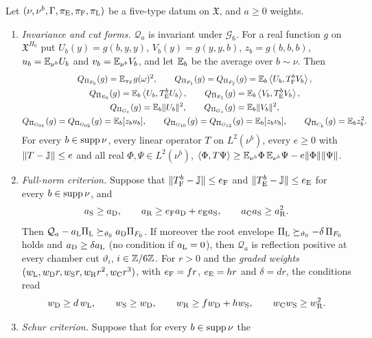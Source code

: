 \begin{lemma}\label{lem:five-type}
Let $(\nu,\nu^b,\Gamma,\pi_{\rm E},\pi_{\rm F},\pi_{\rm L})$ be a five-type datum
on $\mathfrak X$, and $a\ge0$ weights.
\begin{enumerate}[label=\textup{(\alph*)}]
\item \emph{Invariance and cut forms.} $\mathcal Q_a$ is invariant under
 $\mathcal G_6$. For a real function $g$ on $\mathfrak X^{H_0}$ put
 $U_b(y)=g(b,y,y)$, $V_b(y)=g(y,y,b)$, $z_b=g(b,b,b)$, $u_b=\mathbb E_{\nu^b}U_b$ and
 $v_b=\mathbb E_{\nu^b}V_b$, and let $\mathbb E_b$ be the average over $b\sim\nu$. Then
 \begin{gather*}
  Q_{\Pi_{F_0}}(g)=\mathbb E_{\pi_{\rm F}}g(\omega)^2,\qquad
  Q_{\Pi_{F_1}}(g)=Q_{\Pi_{F_2}}(g)=\mathbb E_b\left\langle U_b,T_{\rm F}^bV_b\right\rangle,\\
  Q_{\Pi_{E_0}}(g)=\mathbb E_b\left\langle U_b,T_{\rm E}^bU_b\right\rangle,\qquad
  Q_{\Pi_{E_1}}(g)=\mathbb E_b\left\langle V_b,T_{\rm E}^bV_b\right\rangle,\\
  Q_{\Pi_{G_e}}(g)=\mathbb E_b\|U_b\|^2,\qquad Q_{\Pi_{G_o}}(g)=\mathbb E_b\|V_b\|^2,\\
  Q_{\Pi_{G_{01}}}(g)=Q_{\Pi_{G_{02}}}(g)=\mathbb E_b[z_bu_b],\qquad
  Q_{\Pi_{G_{10}}}(g)=Q_{\Pi_{G_{12}}}(g)=\mathbb E_b[z_bv_b],\qquad
  Q_{\Pi_{C_k}}(g)=\mathbb E_bz_b^2 .
 \end{gather*}
 For every $b\in\operatorname{supp}\nu$, every linear operator $T$ on
 $L^2(\nu^b)$, every $e\ge0$ with $\|T-\mathbb J\|\le e$ and all
  real $\Phi,\Psi\in L^2(\nu^b)$,
 $\left\langle \Phi,T\Psi\right\rangle\ge\mathbb E_{\nu^b}\Phi\,\mathbb E_{\nu^b}\Psi
 -e\|\Phi\|\|\Psi\|$.
\item \emph{Full-norm criterion.} Suppose that
 $\|T_{\rm F}^b-\mathbb J\|\le e_{\rm F}$ and $\|T_{\rm E}^b-\mathbb J\|\le e_{\rm E}$ for
 every $b\in\operatorname{supp}\nu$, and
 \[
  a_{\rm S}\ge a_{\rm D},\qquad a_{\rm R}\ge e_{\rm F}a_{\rm D}+e_{\rm E}a_{\rm S},
  \qquad a_{\rm C}a_{\rm S}\ge a_{\rm R}^2 .
 \]
 Then $\mathcal Q_a-a_{\rm L}\Pi_{\rm L}\succeq_{\vartheta_0}a_{\rm D}\Pi_{F_0}$. If
 moreover the root envelope $\Pi_{\rm L}\succeq_{\vartheta_0}-\delta\,\Pi_{F_0}$
 holds and $a_{\rm D}\ge\delta a_{\rm L}$ (no condition if $a_{\rm L}=0$), then
 $\mathcal Q_a$ is reflection
 positive at every chamber cut $\vartheta_i$, $i\in\mathbb Z/6\mathbb Z$. For $r>0$ and the
 \emph{graded weights} $(w_{\rm L},w_{\rm D}r,w_{\rm S}r,w_{\rm R}r^2,w_{\rm C}r^3)$,
 with $e_{\rm F}=fr$, $e_{\rm E}=hr$ and $\delta=dr$, the conditions read
 \[
  w_{\rm D}\ge d\,w_{\rm L},\qquad w_{\rm S}\ge w_{\rm D},\qquad
  w_{\rm R}\ge fw_{\rm D}+hw_{\rm S},\qquad w_{\rm C}w_{\rm S}\ge w_{\rm R}^2 .
 \]
\item \emph{Schur criterion.} Suppose that for every $b\in\operatorname{supp}\nu$ the

\end{enumerate}
\end{lemma}
